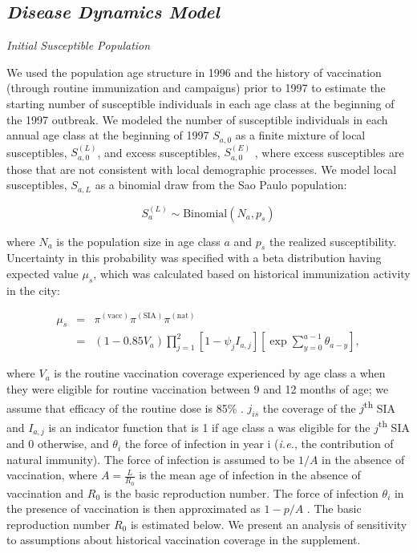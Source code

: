 \subsection{\texorpdfstring{\emph{Disease Dynamics
Model}}{Disease Dynamics Model}}\label{disease-dynamics-model}

\emph{Initial Susceptible Population}

We used the population age structure in 1996 and the history of vaccination (through routine immunization and campaigns) prior to 1997 to estimate the starting number of susceptible individuals in each age class at the beginning of the 1997 outbreak.  We modeled the number of susceptible individuals in each annual age class at the beginning of 1997 \(S_{a,0}\) as a finite mixture of local susceptibles, \(S_{a,0}^{(L)}\), and excess susceptibles, \(S_{a,0}^{(E)}\) , where excess susceptibles are those that are not consistent with local demographic processes.  We model local susceptibles, \(S_{a,L}\) as a binomial draw from the Sao Paulo population:

\[S_a^{(L)} \sim \text{Binomial}(N_a, p_s)\]

where \(N_a\) is the population size in age class \(a\) and \(p_s\) the realized susceptibility. Uncertainty in this probability was specified with a beta distribution having expected value \(\mu_s\), which was calculated based on historical immunization activity in the city:

\begin{eqnarray}
\mu_s &=& \pi^{(\text{vacc})} \pi^{(\text{SIA})}\pi^{(\text{nat})} \\
&=& (1- 0.85 V_a) \prod_{j=1}^2 \left[1- \psi_j I_{a,j} \right] \left[\exp \sum_{y=0}^{a-1} \theta_{a-y} \right],
\end{eqnarray}

where \(V_a\) is the routine vaccination coverage experienced by age class a when they were eligible for routine vaccination between 9 and 12 months of age; we assume that efficacy of the routine dose is 85\% \cite{Uzicanin_2011}.  \(j_{is}\) the coverage of the \(j\)\textsuperscript{th} SIA and \(I_{a,j}\) is an indicator function that is 1 if age class a was eligible for the \(j\)\textsuperscript{th} SIA and 0 otherwise, and \(\theta_i\) the force of infection in year i (\emph{i.e.}, the contribution of natural immunity).  The force of infection is assumed to be \(1/A\) in the absence of vaccination, where \(A=\frac{L}{R_0}\) \cite{Anderson_1981} is the mean age of infection in the absence of vaccination and \(R_0\) is the basic reproduction number. The force of infection \(\theta_i\) in the presence of vaccination is then approximated as \(1-p/A\) \cite{Anderson_1981}.  The basic reproduction number \(R_0\) is estimated below.  We present an analysis of sensitivity to assumptions about historical vaccination coverage in the supplement.

